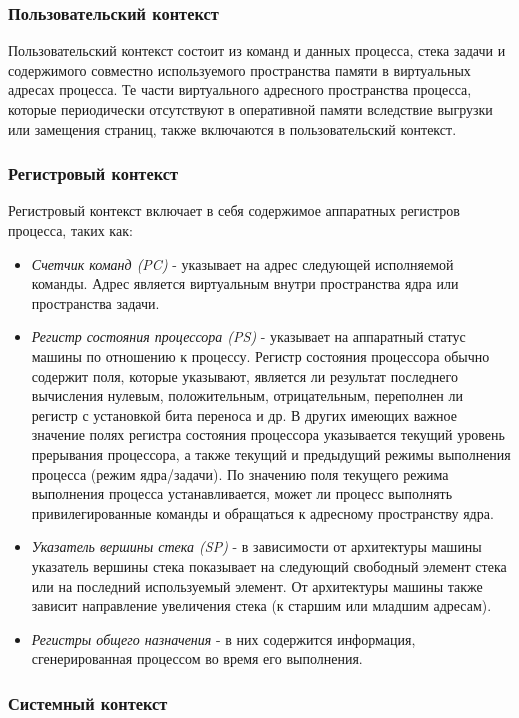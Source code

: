 \documentclass[14pt,a4paper,report]{report}
\begin{document}
\subsubsection{Пользовательский контекст}

Пользовательский контекст состоит из команд и данных процесса, стека задачи и содержимого совместно используемого пространства памяти в виртуальных адресах процесса. Те части виртуального адресного пространства процесса, которые периодически отсутствуют в оперативной памяти вследствие выгрузки или замещения страниц, также включаются в пользовательский контекст.

\subsubsection{Регистровый контекст}

Регистровый контекст включает в себя содержимое аппаратных регистров процесса, таких как:

\begin{itemize}
	\item \emph{Счетчик команд (PC)} - указывает на адрес следующей исполняемой команды. Адрес является виртуальным внутри пространства ядра или пространства задачи.
	\item \emph{Регистр состояния процессора (PS)} - указывает на аппаратный статус машины по отношению к процессу. Регистр состояния процессора обычно содержит поля, которые указывают, является ли результат последнего вычисления нулевым, положительным, отрицательным, переполнен ли регистр с установкой бита переноса и др. В других имеющих важное значение полях регистра состояния процессора указывается текущий уровень прерывания процессора, а также текущий и предыдущий режимы выполнения процесса (режим ядра/задачи). По значению поля текущего режима выполнения процесса устанавливается, может ли процесс выполнять привилегированные команды и обращаться к адресному пространству ядра.
	\item \emph{Указатель вершины стека (SP)} - в зависимости от архитектуры машины указатель вершины стека показывает на следующий свободный элемент стека или на последний используемый элемент. От архитектуры машины также зависит направление увеличения стека (к старшим или младшим адресам).
	\item \emph{Регистры общего назначения} - в них содержится информация, сгенерированная процессом во время его выполнения. 
\end{itemize}

\subsubsection{Системный контекст}
\end{document}
